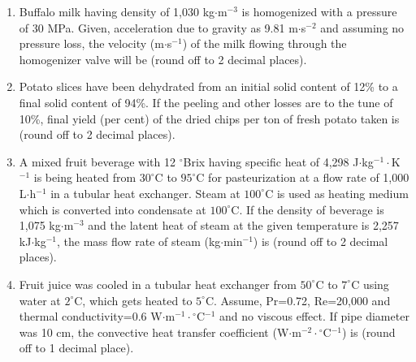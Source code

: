 \documentclass[journal,12pt,onecolumn]{IEEEtran}
\begin{document}
\begin{enumerate}
\vspace{0.5cm}

\item Buffalo milk having density of 1,030 kg$\cdot$m$^{-3}$ is homogenized with a pressure of 30 MPa. Given, acceleration due to gravity as 9.81 m$\cdot$s$^{-2}$ and assuming no pressure loss, the velocity (m$\cdot$s$^{-1}$) of the milk flowing through the homogenizer valve will be \underline{\hspace{2cm}} (round off to 2 decimal places).
\vspace{0.05cm}
\hfill{} \\

\vspace{0.5cm}

\item Potato slices have been dehydrated from an initial solid content of 12\% to a final solid content of 94\%. If the peeling and other losses are to the tune of 10\%, final yield (per cent) of the dried chips per ton of fresh potato taken is \underline{\hspace{2cm}} (round off to 2 decimal places).
\hfill{} \\

\vspace{0.5cm}

\item A mixed fruit beverage with 12 $^\circ$Brix having specific heat of 4,298 J$\cdot$kg$^{-1}\cdot$K$^{-1}$ is being heated from $30^\circ$C to $95^\circ$C for pasteurization at a flow rate of 1,000 L$\cdot$h$^{-1}$ in a tubular heat exchanger. Steam at $100^\circ$C is used as heating medium which is converted into condensate at $100^\circ$C. If the density of beverage is 1,075 kg$\cdot$m$^{-3}$ and the latent heat of steam at the given temperature is 2,257 kJ$\cdot$kg$^{-1}$, the mass flow rate of steam (kg$\cdot$min$^{-1}$) is \underline{\hspace{2cm}} (round off to 2 decimal places).
\hfill{} \\

\vspace{0.5cm}

\item Fruit juice was cooled in a tubular heat exchanger from $50^\circ$C to $7^\circ$C using water at $2^\circ$C, which gets heated to $5^\circ$C. Assume, Pr=0.72, Re=20,000 and thermal conductivity=0.6 W$\cdot$m$^{-1}\cdot{}^\circ$C$^{-1}$ and no viscous effect. If pipe diameter was 10 cm, the convective heat transfer coefficient (W$\cdot$m$^{-2}\cdot{}^\circ$C$^{-1}$) is \underline{\hspace{2cm}} (round off to 1 decimal place).
\hfill{} \\


\end{enumerate}
\end{document}
